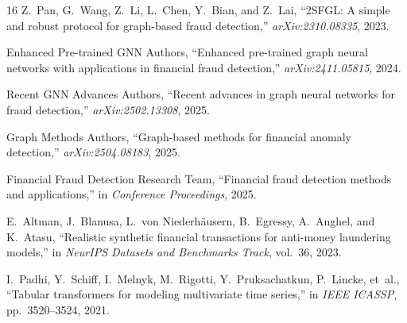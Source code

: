 \documentclass[11pt, a4paper]{article}
\begin{document}
\begin{thebibliography}{16}
Z.~Pan, G.~Wang, Z.~Li, L.~Chen, Y.~Bian, and Z.~Lai, ``2SFGL: A simple and robust protocol for graph-based fraud detection,'' \emph{arXiv:2310.08335}, 2023.

{Enhanced Pre-trained GNN Authors}, ``Enhanced pre-trained graph neural networks with applications in financial fraud detection,'' \emph{arXiv:2411.05815}, 2024.

{Recent GNN Advances Authors}, ``Recent advances in graph neural networks for fraud detection,'' \emph{arXiv:2502.13308}, 2025.

{Graph Methods Authors}, ``Graph-based methods for financial anomaly detection,'' \emph{arXiv:2504.08183}, 2025.

{Financial Fraud Detection Research Team}, ``Financial fraud detection methods and applications,'' in \emph{Conference Proceedings}, 2025.

E.~Altman, J.~Blanusa, L.~von Niederh{\"a}usern, B.~Egressy, A.~Anghel, and K.~Atasu, ``Realistic synthetic financial transactions for anti-money laundering models,'' in \emph{NeurIPS Datasets and Benchmarks Track}, vol.~36, 2023.

I.~Padhi, Y.~Schiff, I.~Melnyk, M.~Rigotti, Y.~Pruksachatkun, P.~Lincke, et~al., ``Tabular transformers for modeling multivariate time series,'' in \emph{IEEE ICASSP}, pp.~3520--3524, 2021.
\end{thebibliography}
\end{document}
